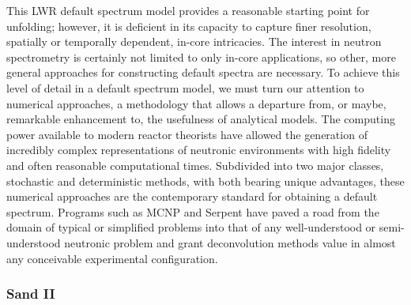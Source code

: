 This LWR default spectrum model provides a reasonable starting point for unfolding; however, it is deficient in its capacity to capture finer resolution, spatially or temporally dependent, in-core intricacies.
The interest in neutron spectrometry is certainly not limited to only in-core applications, so other, more general approaches for constructing default spectra are necessary.
To achieve this level of detail in a default spectrum model, we must turn our attention to numerical approaches, a methodology that allows a departure from, or maybe, remarkable enhancement to, the usefulness of analytical models.
The computing power available to modern reactor theorists have allowed the generation of incredibly complex representations of neutronic environments with high fidelity and often reasonable computational times.
Subdivided into two major classes, stochastic and deterministic methods, with both bearing unique advantages, these numerical approaches are the contemporary standard for obtaining a default spectrum.
Programs such as MCNP and Serpent have paved a road from the domain of typical or simplified problems into that of any well-understood or semi-understood neutronic problem and grant deconvolution methods value in almost any conceivable experimental configuration.





\subsubsection{Sand II}

